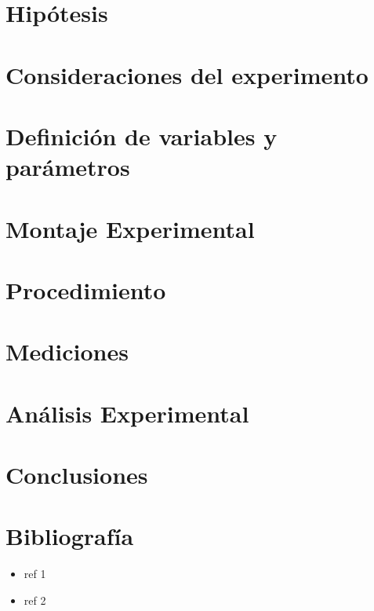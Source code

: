 \documentclass[12pt]{article}
\begin{document}
\section{Hipótesis}

\section{Consideraciones del experimento}

\section{Definición de variables y parámetros}

\section{Montaje Experimental}

\section{Procedimiento}

\section{Mediciones}

\section{Análisis Experimental}

\section{Conclusiones}

\section{Bibliografía}
\begin{itemize}
    \item ref 1
    \item ref 2
\end{itemize}

 
\end{document}
